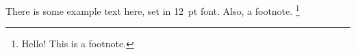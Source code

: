 \documentclass[a4paper, 12pt]{article}
\begin{document}
There is some example text here, set in 12~pt font.
Also, a footnote.%
\footnote{Hello! This is a footnote.}
\end{document}
